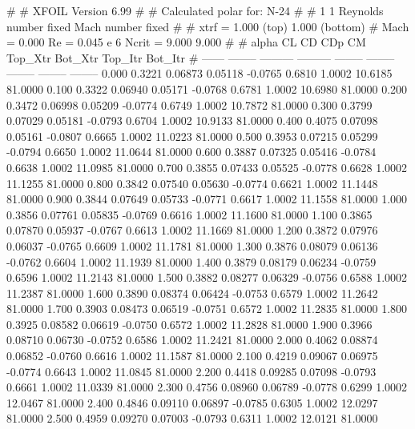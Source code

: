 #  
#       XFOIL         Version 6.99
#  
# Calculated polar for: N-24                                            
#  
# 1 1 Reynolds number fixed          Mach number fixed         
#  
# xtrf =   1.000 (top)        1.000 (bottom)  
# Mach =   0.000     Re =     0.045 e 6     Ncrit =   9.000  9.000
#  
#   alpha    CL        CD       CDp       CM     Top_Xtr  Bot_Xtr  Top_Itr  Bot_Itr
#  ------ -------- --------- --------- -------- -------- -------- -------- --------
   0.000   0.3221   0.06873   0.05118  -0.0765   0.6810   1.0002  10.6185  81.0000
   0.100   0.3322   0.06940   0.05171  -0.0768   0.6781   1.0002  10.6980  81.0000
   0.200   0.3472   0.06998   0.05209  -0.0774   0.6749   1.0002  10.7872  81.0000
   0.300   0.3799   0.07029   0.05181  -0.0793   0.6704   1.0002  10.9133  81.0000
   0.400   0.4075   0.07098   0.05161  -0.0807   0.6665   1.0002  11.0223  81.0000
   0.500   0.3953   0.07215   0.05299  -0.0794   0.6650   1.0002  11.0644  81.0000
   0.600   0.3887   0.07325   0.05416  -0.0784   0.6638   1.0002  11.0985  81.0000
   0.700   0.3855   0.07433   0.05525  -0.0778   0.6628   1.0002  11.1255  81.0000
   0.800   0.3842   0.07540   0.05630  -0.0774   0.6621   1.0002  11.1448  81.0000
   0.900   0.3844   0.07649   0.05733  -0.0771   0.6617   1.0002  11.1558  81.0000
   1.000   0.3856   0.07761   0.05835  -0.0769   0.6616   1.0002  11.1600  81.0000
   1.100   0.3865   0.07870   0.05937  -0.0767   0.6613   1.0002  11.1669  81.0000
   1.200   0.3872   0.07976   0.06037  -0.0765   0.6609   1.0002  11.1781  81.0000
   1.300   0.3876   0.08079   0.06136  -0.0762   0.6604   1.0002  11.1939  81.0000
   1.400   0.3879   0.08179   0.06234  -0.0759   0.6596   1.0002  11.2143  81.0000
   1.500   0.3882   0.08277   0.06329  -0.0756   0.6588   1.0002  11.2387  81.0000
   1.600   0.3890   0.08374   0.06424  -0.0753   0.6579   1.0002  11.2642  81.0000
   1.700   0.3903   0.08473   0.06519  -0.0751   0.6572   1.0002  11.2835  81.0000
   1.800   0.3925   0.08582   0.06619  -0.0750   0.6572   1.0002  11.2828  81.0000
   1.900   0.3966   0.08710   0.06730  -0.0752   0.6586   1.0002  11.2421  81.0000
   2.000   0.4062   0.08874   0.06852  -0.0760   0.6616   1.0002  11.1587  81.0000
   2.100   0.4219   0.09067   0.06975  -0.0774   0.6643   1.0002  11.0845  81.0000
   2.200   0.4418   0.09285   0.07098  -0.0793   0.6661   1.0002  11.0339  81.0000
   2.300   0.4756   0.08960   0.06789  -0.0778   0.6299   1.0002  12.0467  81.0000
   2.400   0.4846   0.09110   0.06897  -0.0785   0.6305   1.0002  12.0297  81.0000
   2.500   0.4959   0.09270   0.07003  -0.0793   0.6311   1.0002  12.0121  81.0000

